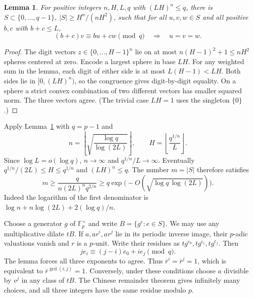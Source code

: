\documentclass[11pt]{article}
\newcommand{\Fp}{\mathbb F_p}
\newtheorem{lemma}{Lemma}
\begin{document}
\begin{lemma}\label{digits}
For positive integers $n,H,L,q$ with $(LH)^n\le q$, there is
$S\subset\{0,\ldots,q-1\}$, $|S|\ge H^n/(nH^2)$, such that for all
$u,v,w\in S$ and all positive $b,c$ with $b+c\le L$,
\[
          (b+c)v\equiv bu+cw\pmod q\quad\Longrightarrow\quad u=v=w .
\]
\end{lemma}

\newpage
\begin{proof}
The digit vectors $z\in\{0,\ldots,H-1\}^n$ lie on at most
$n(H-1)^2+1\le nH^2$ spheres centered at zero. Encode a largest sphere in
base $LH$. For any weighted sum in the lemma, each digit of either side is
at most $L(H-1)<LH$. Both sides lie in $[0,(LH)^n)$, so the congruence
gives digit-by-digit equality. On a sphere a strict convex combination of
two different vectors has smaller squared norm. The three vectors agree.
(The trivial case $LH=1$ uses the singleton $\{0\}$.)
\end{proof}

Apply Lemma~\ref{digits} with $q=p-1$ and
\[
  n=\left\lfloor\sqrt{\frac{\log q}{\log(2L)}}\right\rfloor,
  \qquad H=\left\lfloor\frac{q^{1/n}}{L}\right\rfloor .
\]
Since $\log L=o(\log q)$, $n\to\infty$ and $q^{1/n}/L\to\infty$.
Eventually $q^{1/n}/(2L)\le H\le q^{1/n}$ and $(LH)^n\le q$. The number
$m=|S|$ therefore satisfies
\[
 m\ge\frac{q}{n(2L)^n q^{2/n}}\ge q\exp\bigl(-O(\sqrt{\log q\,\log(2L)})\bigr).
\]
Indeed the logarithm of the first denominator is
$\log n+n\log(2L)+2(\log q)/n$.

Choose a generator $g$ of $\Fp^\times$ and write $B=\{g^e:e\in S\}$. We may
use any multiplicative dilate $tB$. If $a,ar^i,ar^j$ lie in its periodic
inverse image, their $p$-adic valuations vanish and $r$ is a $p$-unit. Write
their residues as $tg^{e_0},tg^{e_i},tg^{e_j}$. Then
\[
                  j e_i\equiv (j-i)e_0+i e_j\pmod q.
\]
The lemma forces all three exponents to agree. Thus $\bar r^i=\bar r^j=1$,
which is equivalent to $\bar r^{\gcd(i,j)}=1$. Conversely, under these
conditions choose $a$ divisible by $v^j$ in any class of $tB$. The Chinese
remainder theorem gives infinitely many choices, and all three integers
have the same residue modulo $p$.
\end{document}
